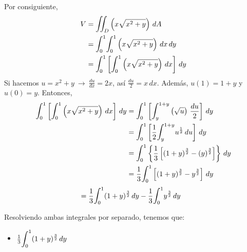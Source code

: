 \documentclass[12pt]{exam}
\begin{document}
\begin{questions}
\begin{enumerate}[a)]
    Por consiguiente,
    \begin{align*}
      V
      &= \mathlarger{\iint}_D \left(x\sqrt{x^2+y}\right)\,dA \\
      &= \mathlarger{\int}_0^1\mathlarger{\int}_0^1\left(x\sqrt{x^2+y}\right)\,dx\,dy\\
      &= \mathlarger{\int}_0^1\left[\mathlarger{\int}_0^1\left(x\sqrt{x^2+y}\right)\,dx\right]\,dy
    \end{align*}
    Si hacemos $u=x^2+y~\rightarrow ~ \frac{du}{dx}=2x$, así $\frac{du}{2}=x\,dx$. Además, $u(1)=1+y$ y $u(0)=y$. Entonces,
    \begin{align*}
      \mathlarger{\int}_0^1\left[\mathlarger{\int}_0^1\left(x\sqrt{x^2+y}\right)\,dx\right]\,dy
      &= \mathlarger{\int}_0^1\left[\mathlarger{\int}_{y}^{1+y}\left(\sqrt{u}\right)\,\frac{du}{2}\right]\,dy\\
      &= \mathlarger{\int}_0^1\left[\frac{1}{2}\mathlarger{\int}_{y}^{1+y}u^{\frac{1}{2}}\,du\right]\,dy\\
      &= \mathlarger{\int}_0^1\left\{\frac{1}{3}\left[(1+y)^{\frac{3}{2}}-(y)^{\frac{3}{2}}\right]\right\}\,dy\\
      &=\frac{1}{3}\mathlarger{\int}_0^1\left[(1+y)^{\frac{3}{2}}-y^{\frac{3}{2}}\right]\,dy
    \end{align*}
    \begin{align*}
      &= \frac{1}{3}\mathlarger{\int}_0^1(1+y)^{\frac{3}{2}}\, dy - \frac{1}{3}\mathlarger{\int}_0^1 y^{\frac{3}{2}}\,dy
    \end{align*}
    
    Resolviendo ambas integrales por separado, tenemos que:
    
    \begin{multicols}{2}
      \begin{itemize}[format=\textbf]
      \item $ \frac{1}{3}\mathlarger{\int}_0^1(1+y)^{\frac{3}{2}}\, dy$
        

\end{itemize}
\end{multicols}
\end{enumerate}
\end{questions}
\end{document}

